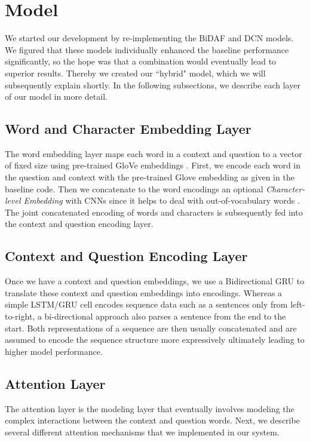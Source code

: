 \documentclass{article} %
\begin{document}
\section{Model}
We started our development by re-implementing the BiDAF and DCN models. We figured that these models individually enhanced the baseline performance significantly, so the hope was that a combination would eventually lead to superior results. Thereby we created our ``hybrid" model, which we will subsequently explain shortly. In the following subsections, we describe each layer of our model in more detail.

\subsection{Word and Character Embedding Layer}
The word embedding layer maps each word in a context and question to a vector of fixed size using pre-trained GloVe embeddings \cite{glove}. First, we encode each word in the question and context with the pre-trained Glove embedding as given in the baseline code. Then we concatenate to the word encodings an optional {\em Character-level Embedding} with CNNs since it helps to deal with out-of-vocabulary words \cite{bidaf, kim}. The joint concatenated encoding of words and characters is subsequently fed into the context and question encoding layer.

\subsection{Context and Question Encoding Layer}
Once we have a context and question embeddings, we use a Bidirectional GRU to translate these context and question embeddings into encodings. Whereas a simple LSTM/GRU cell encodes sequence data such as a sentences only from left-to-right, a bi-directional approach also parses a sentence from the end to the start. Both representations of a sequence are then usually concatenated and are assumed to encode the sequence structure more expressively ultimately leading to higher model performance.

\subsection{Attention Layer}
The attention layer is the modeling layer that eventually involves modeling the complex interactions between the context and question words. Next, we describe several different attention mechanisms that we implemented in our system. 
\end{document}
